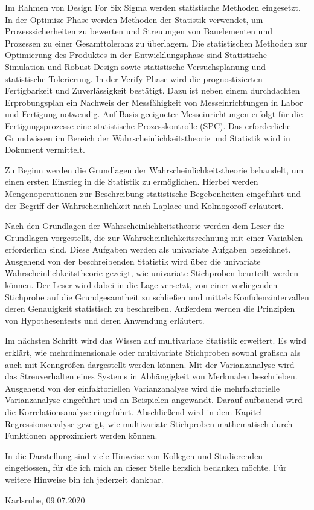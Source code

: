 \noindent Im Rahmen von Design For Six Sigma werden statistische Methoden eingesetzt. In der Optimize-Phase werden Methoden der Statistik verwendet, um Prozesssicherheiten zu bewerten und Streuungen von Bauelementen und Prozessen zu einer Gesamttoleranz zu \"{u}berlagern. Die statistischen Methoden zur Optimierung des Produktes in der Entwicklungsphase sind Statistische Simulation und Robust Design sowie statistische Versuchsplanung und statistische Tolerierung. In der Verify-Phase wird die prognostizierten Fertigbarkeit und Zuverl\"{a}ssigkeit best\"{a}tigt. Dazu ist neben einem durchdachten Erprobungsplan ein Nachweis der Messf\"{a}higkeit von Messeinrichtungen in Labor und Fertigung notwendig. Auf Basis geeigneter Messeinrichtungen erfolgt f\"{u}r die Fertigungsprozesse eine statistische Prozesskontrolle (SPC). Das erforderliche Grundwissen im Bereich der Wahrscheinlichkeitstheorie und Statistik wird in Dokument vermittelt.\newline

\noindent Zu Beginn werden die Grundlagen der Wahrscheinlichkeitstheorie behandelt, um einen ersten Einstieg in die Statistik zu erm\"{o}glichen. Hierbei werden Mengenoperationen zur Beschreibung statistische Begebenheiten eingef\"{u}hrt und der Begriff der Wahrscheinlichkeit nach Laplace und Kolmogoroff erl\"{a}utert.\newline

\noindent Nach den Grundlagen der Wahrscheinlichkeitstheorie werden dem Leser die Grundlagen vorgestellt, die zur Wahrscheinlichkeitsrechnung mit einer Variablen erforderlich sind. Diese Aufgaben werden als univariate Aufgaben bezeichnet. Ausgehend von der beschreibenden Statistik wird \"{u}ber die univariate Wahrscheinlichkeitstheorie gezeigt, wie univariate Stichproben beurteilt werden k\"{o}nnen. Der Leser wird dabei in die Lage versetzt, von einer vorliegenden Stichprobe auf die Grundgesamtheit zu schlie{\ss}en und mittels Konfidenzintervallen deren Genauigkeit statistisch zu beschreiben. Au{\ss}erdem werden die Prinzipien von Hypothesentests und deren Anwendung erl\"{a}utert.\newline

\noindent Im n\"{a}chsten Schritt wird das Wissen auf multivariate Statistik erweitert. Es wird erkl\"{a}rt, wie mehrdimensionale oder multivariate Stichproben sowohl grafisch als auch mit Kenngr\"{o}{\ss}en dargestellt werden k\"{o}nnen. Mit der Varianzanalyse wird das Streuverhalten eines Systems in Abh\"{a}ngigkeit von Merkmalen beschrieben. Ausgehend von der einfaktoriellen Varianzanalyse wird die mehrfaktorielle Varianzanalyse eingef\"{u}hrt und an Beispielen angewandt. Darauf aufbauend wird die Korrelationsanalyse eingef\"{u}hrt. Abschlie{\ss}end wird in dem Kapitel Regressionsanalyse gezeigt, wie multivariate Stichproben mathematisch durch Funktionen approximiert werden k\"{o}nnen.\newline

\noindent In die Darstellung sind viele Hinweise von Kollegen und Studierenden eingeflossen, f\"{u}r die ich mich an dieser Stelle herzlich bedanken m\"{o}chte. F\"{u}r weitere Hinweise bin ich jederzeit dankbar.\newline

\noindent Karlsruhe, 09.07.2020
